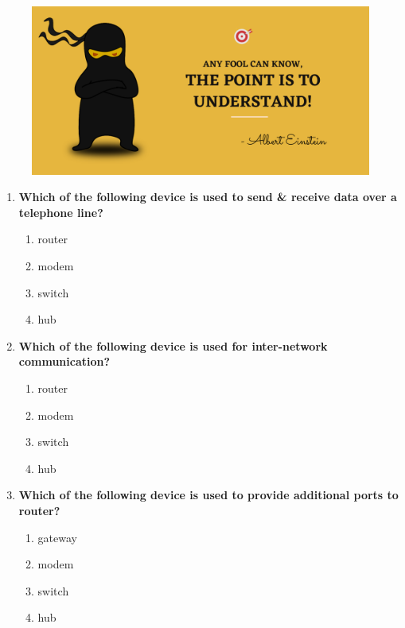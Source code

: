 \setlength{\columnsep}{3pt}
\begin{flushleft}
	
	\paragraph{}
	\bigskip
	
	\begin{figure}[h!]
		\centering
		\includegraphics[scale=.2]{content/practise.jpg}
	\end{figure}	
	\begin{enumerate}
		
		\item \textbf{Which of the following device is used to send \& receive data over a telephone line?}
		\begin{enumerate}[label=(\alph*)]
			\item router
			\item modem %
			\item switch
			\item hub
		\end{enumerate}
		\bigskip
		\bigskip
		
		\item \textbf{Which of the following device is used for inter-network communication?}
		\begin{enumerate}[label=(\alph*)]
			\item router %
			\item modem 
			\item switch
			\item hub
		\end{enumerate}
		\bigskip
		\bigskip	
		
		\item \textbf{Which of the following device is used to provide additional ports to router?}
		\begin{enumerate}[label=(\alph*)]
			\item gateway
			\item modem 
			\item switch   %
			\item hub
		\end{enumerate}
		\bigskip
		\bigskip	


\end{enumerate}
\end{flushleft}
